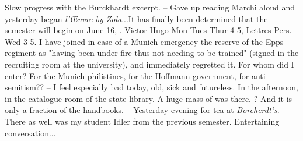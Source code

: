 
Slow progress with the Burckhardt excerpt. -- Gave up reading Marchi aloud and yesterday began \textit{l'\OE uvre by Zola}...It has finally been determined that the semester will begin on June 16, . Victor Hugo Mon Tues Thur 4-5, Lettres Pers. Wed 3-5. I have joined in case of a Munich emergency the reserve of the Epps regiment as "having been under fire thus not needing to be trained" (signed in the recruiting room at the university), and immediately regretted it. For whom did I enter? For the Munich philistines, for the Hoffmann government, for anti-semitism?? -- I feel especially bad today, old, sick and futureless. In the afternoon, in the catalogue room of the state library. A huge mass of  was there. ? And it is only a fraction of the handbooks. -- Yesterday evening for tea at \textit{Borcherdt's}. There as well was my student Idler from the previous semester. Entertaining conversation... 